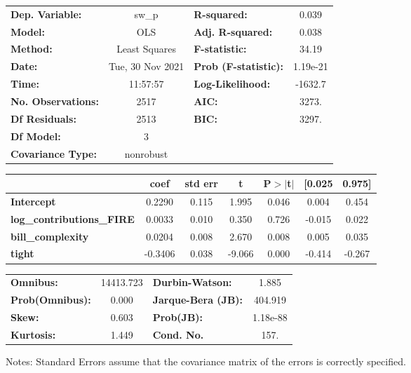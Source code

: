 \begin{center}
\begin{tabular}{lclc}
\toprule
\textbf{Dep. Variable:}           &      sw\_p       & \textbf{  R-squared:         } &     0.039   \\
\textbf{Model:}                   &       OLS        & \textbf{  Adj. R-squared:    } &     0.038   \\
\textbf{Method:}                  &  Least Squares   & \textbf{  F-statistic:       } &     34.19   \\
\textbf{Date:}                    & Tue, 30 Nov 2021 & \textbf{  Prob (F-statistic):} &  1.19e-21   \\
\textbf{Time:}                    &     11:57:57     & \textbf{  Log-Likelihood:    } &   -1632.7   \\
\textbf{No. Observations:}        &        2517      & \textbf{  AIC:               } &     3273.   \\
\textbf{Df Residuals:}            &        2513      & \textbf{  BIC:               } &     3297.   \\
\textbf{Df Model:}                &           3      & \textbf{                     } &             \\
\textbf{Covariance Type:}         &    nonrobust     & \textbf{                     } &             \\
\bottomrule
\end{tabular}
\begin{tabular}{lcccccc}
                                  & \textbf{coef} & \textbf{std err} & \textbf{t} & \textbf{P$> |$t$|$} & \textbf{[0.025} & \textbf{0.975]}  \\
\midrule
\textbf{Intercept}                &       0.2290  &        0.115     &     1.995  &         0.046        &        0.004    &        0.454     \\
\textbf{log\_contributions\_FIRE} &       0.0033  &        0.010     &     0.350  &         0.726        &       -0.015    &        0.022     \\
\textbf{bill\_complexity}         &       0.0204  &        0.008     &     2.670  &         0.008        &        0.005    &        0.035     \\
\textbf{tight}                    &      -0.3406  &        0.038     &    -9.066  &         0.000        &       -0.414    &       -0.267     \\
\bottomrule
\end{tabular}
\begin{tabular}{lclc}
\textbf{Omnibus:}       & 14413.723 & \textbf{  Durbin-Watson:     } &    1.885  \\
\textbf{Prob(Omnibus):} &    0.000  & \textbf{  Jarque-Bera (JB):  } &  404.919  \\
\textbf{Skew:}          &    0.603  & \textbf{  Prob(JB):          } & 1.18e-88  \\
\textbf{Kurtosis:}      &    1.449  & \textbf{  Cond. No.          } &     157.  \\
\bottomrule
\end{tabular}
\end{center}

Notes: \newline
 [1] Standard Errors assume that the covariance matrix of the errors is correctly specified.